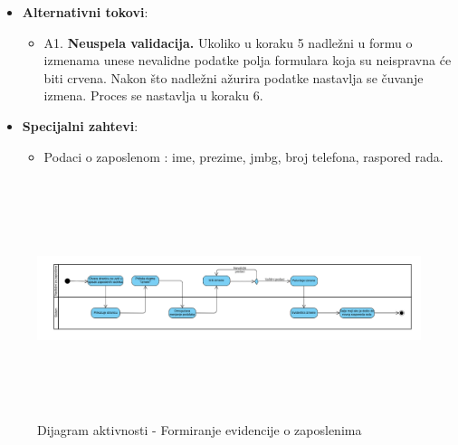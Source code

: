 \begin{itemize}
  \item \textbf{Alternativni tokovi}:
      \begin{itemize}
        \item A1. \textbf{Neuspela validacija.}
        Ukoliko u koraku 5 nadležni u formu o izmenama unese nevalidne podatke polja formulara koja su neispravna će biti crvena.
        Nakon što nadležni ažurira podatke nastavlja se čuvanje izmena. Proces se nastavlja u koraku 6.
      \end{itemize}

      
  \item \textbf{Specijalni zahtevi}:
      \begin{itemize}
        \item Podaci o zaposlenom : ime, prezime, jmbg, broj telefona, raspored rada.
      \end{itemize}
\end{itemize}

\begin{figure}[H]
  \begin{center}
      \includegraphics[width=170mm, height=70mm]{Diagrams/evidencija_zaposlenih.png}
  \end{center}
  \caption {Dijagram aktivnosti - Formiranje evidencije o zaposlenima}
  \label{activity_evidencija_zaposlenih}

\end{figure}
